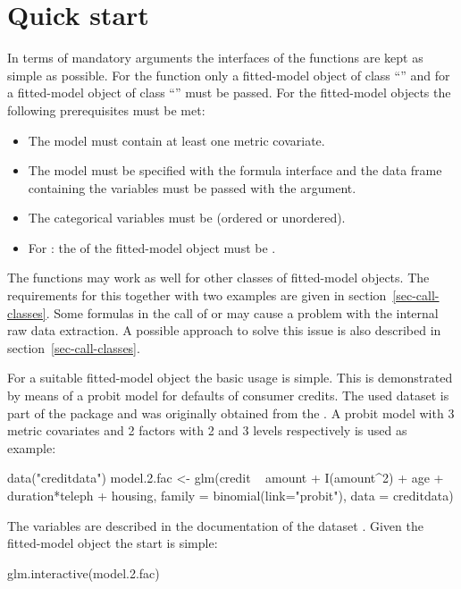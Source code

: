 \documentclass[nojss]{jss}
\newcommand{\class}[1]{``\code{#1}''}
\begin{document}
\section{Quick start} \label{sec-quickstart}
In terms of mandatory arguments the interfaces of the functions are kept as simple as possible. For the function  only a fitted-model object of class \class{glm} and for  a fitted-model object of class \class{lm} must be passed.
For the fitted-model objects the following prerequisites must be met:
\begin{itemize} [leftmargin=1cm, rightmargin=0.5cm, label=$\bullet$]
\item  The model must contain at least one metric covariate.
\item The model must be specified with the formula interface and the data frame containing the variables must be passed with the  argument.
\item The categorical variables must be  (ordered or unordered).
\item For : the  of the fitted-model object must be .
\end{itemize}

The functions may work as well for other classes of fitted-model objects. The requirements for this together with two examples are given in section~\ref{sec-call-classes}. Some formulas in the call of  or   may cause a problem with the internal raw data extraction. A possible approach to solve this issue is also described in section~\ref{sec-call-classes}.

For a suitable fitted-model object the basic usage is simple. This is demonstrated by means of a probit model for defaults of consumer credits. The used dataset   is part of the package and was originally obtained from the \citet{DataCred2014}. A probit model with 3 metric covariates and 2 factors with 2 and 3 levels respectively is used as example:
%
\begin{Schunk}
\begin{Sinput}
 data("creditdata")
 model.2.fac <- glm(credit ~ amount + I(amount^2)  + age + duration*teleph  
     + housing, family = binomial(link="probit"), data = creditdata)
\end{Sinput}
\end{Schunk}
%

The variables are described in the documentation of the dataset .
Given the fitted-model object the start is simple:
%
\begin{Schunk}
\begin{Sinput}
 glm.interactive(model.2.fac) 
\end{Sinput}
\end{Schunk}
%
\end{document}
